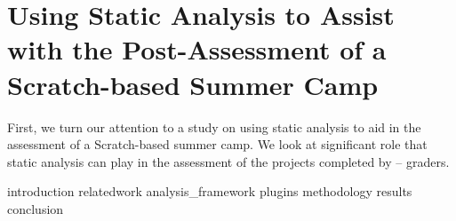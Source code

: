 \chapter{Using Static Analysis to Assist with the Post-Assessment of a
               Scratch-based Summer Camp}
\label{chap:hairball}

\def\currentprefix{hairball}

First, we turn our attention to a study on using static analysis to aid in the
assessment of a Scratch-based summer camp. We look at significant role that
static analysis can play in the assessment of the projects completed by 
--  graders.

{introduction}
{relatedwork}
{analysis_framework}
{plugins}
{methodology}
{results}
{conclusion}
